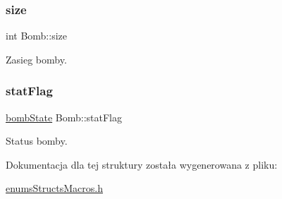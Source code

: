 \subsubsection{\texorpdfstring{size}{size}}
{\footnotesize\ttfamily int Bomb\+::size}

Zasieg bomby. \mbox{\label{struct_bomb_a2fa3684effcc6e03d4ca9d47cc92c0b4}} 
\subsubsection{\texorpdfstring{stat\+Flag}{statFlag}}
{\footnotesize\ttfamily \mbox{\hyperlink{enums_structs_macros_8h_a85862f8bba17794a87d664e16fe33acb}{bomb\+State}} Bomb\+::stat\+Flag}

Status bomby. 

Dokumentacja dla tej struktury została wygenerowana z pliku\+:\begin{DoxyCompactItemize}
\item 
\mbox{\hyperlink{enums_structs_macros_8h}{enums\+Structs\+Macros.\+h}}\end{DoxyCompactItemize}
